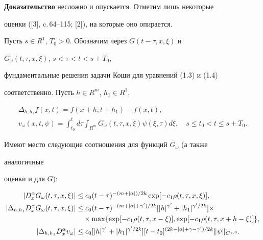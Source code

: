  


{\bf Доказательство} несложно и опускается. Отметим лишь некоторые 


оценки ([3], c.\,64--115; [2]), на которые оно опирается. 


 


Пусть $s\in R^1$, $T_0>0$. Обозначим через $G(t-\tau,x,\xi)$ и 


$G_\omega(t,\tau,x,\xi)$, $s<\tau<t<s+T_0$, 


фундаментальные решения задачи Коши для уравнений (1.3) и (1.4) 


соответственно. Пусть $h\in R^m$, $h_1\in R^1$, 


\begin{gather*} 


\Delta_{h,h_1}f(x,t)=f(x+h,t+h_1)-f(x,t),\\ 


% 


v_\omega(x,t,\psi)=\int^t_{t_0}d\tau\int_{R^m} 


G_\omega(t,\tau,x,\xi)\psi(\xi,\tau)d\xi,\quad 


s\le t_0<t\le s+T_0. 


\end{gather*} 


Имеют место следующие соотношения для функций $G_\omega$ (а также 


аналогичные 


оценки и для $G$): 


\begin{align} 


|D^\alpha_x G_\omega(t,\tau,x,\xi)|&\le 


c_0(t-\tau)^{-(m+|\alpha|)/2k}\exp[-c_1\rho(t,\tau,x,\xi)],\\ 


% 


|\Delta_{h,h_1}D^\alpha_x G_\omega(t,\tau,x,\xi)|&\le 


c_0(t-\tau)^{-(m+|\alpha|+\gamma')/2k} 


[|h|^{\gamma'}+|h_1|^{\gamma'/2k}]\times\notag\\ 


% 


&\quad\times\max\{\exp[-c_1\rho(t,\tau,x-\xi)],\exp 


[-c_1\rho(t,\tau,x+h-\xi)]\},\\ 


% 


|\Delta_{h,h_1}D^\alpha_x v_\omega|&\le c_0[|h|^{\gamma'}+ 


|h_1|^{\gamma'/2k}][t-t_0]^{(2k-|\alpha|+\gamma-\gamma')/2k} 


\|\psi\|_{C^{\gamma,0}}. 


\end{align} 



